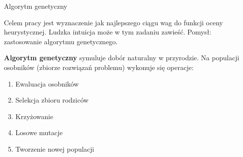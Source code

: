 \begin{frame}{Algorytm genetyczny}

	\begin{itemize}
		\myitem Celem pracy jest wyznaczenie jak najlepszego ciągu wag do funkcji oceny heurystycznej.
		\myitem Ludzka intuicja może w tym zadaniu zawieść.
		\myitem Pomysł: zastosowanie algorytmu genetycznego.
	\end{itemize}
	
	\hspace{1cm}

	\textbf{Algorytm genetyczny} symuluje dobór naturalny w przyrodzie. Na populacji osobników (zbiorze rozwiązań problemu) wykonuje się operacje:
	\begin{enumerate}
		\item Ewaluacja osobników
		\item Selekcja zbioru rodziców
		\item Krzyżowanie 
		\item Losowe mutacje
		\item Tworzenie nowej populacji
	\end{enumerate}
	
			
			
					
						
							
							
							
							

\end{frame}
